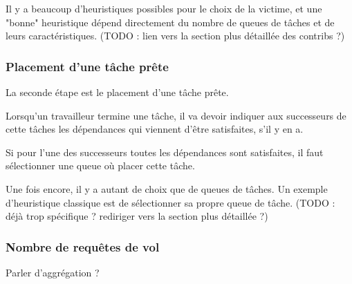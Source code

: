 Il y a beaucoup d'heuristiques possibles pour le choix de la victime, et une "bonne" heuristique dépend directement du nombre de queues de tâches et de leurs caractéristiques.
(TODO : lien vers la section plus détaillée des contribs ?)

\subsubsection{Placement d'une tâche prête}

La seconde étape est le placement d'une tâche prête.

Lorsqu'un travailleur termine une tâche, il va devoir indiquer aux successeurs de cette tâches les dépendances qui viennent d'être satisfaites, s'il y en a.

Si pour l'une des successeurs toutes les dépendances sont satisfaites, il faut sélectionner une queue où placer cette tâche.

Une fois encore, il y a autant de choix que de queues de tâches. Un exemple d'heuristique classique est de sélectionner sa propre queue de tâche.
(TODO : déjà trop spécifique ? rediriger vers la section plus détaillée ?)

\subsubsection{Nombre de requêtes de vol}

Parler d'aggrégation ?


